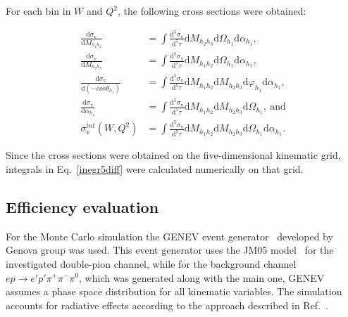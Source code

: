 \documentclass[prc,twocolumn,superscriptaddress,showpacs,amssymb,amsmath,amsfonts,aps,nofootinbib]{revtex4-1}
\begin{document}
For each bin in $W$ and $Q^2$, the following cross sections were obtained:

\begin{equation}
\begin{aligned}
\frac{\textrm{d}\sigma_{\text{v}}}{\textrm{d}M_{h_{1}h_{2}}} & =
\int\frac{\textrm{d}^{5}\sigma_{\text{v}}}{\textrm{d}^{5}\tau}\textrm{d}M_{h_{2}h_{3}}\textrm{d}\Omega_{h_{1}}\textrm{d}\alpha_{h_{1}}\text{,}  \\
\frac{\textrm{d}\sigma_{\text{v}}}{\textrm{d}M_{h_{2}h_{3}}} & =
\int\frac{\textrm{d}^{5}\sigma_{\text{v}}}{\textrm{d}^{5}\tau}\textrm{d}M_{h_{1}h_{2}}\textrm{d}\Omega_{h_{1}}\textrm{d}\alpha_{h_{1}}\text{,} \\
\frac{\textrm{d}\sigma_{\text{v}}}{\textrm{d}(-cos\theta_{h_{1}})} & =
\int\frac{\textrm{d}^{5}\sigma_{\text{v}}}{\textrm{d}^{5}\tau}\textrm{d}M_{h_{1}h_{2}}\textrm{d}M_{h_{2}h_{3}}\textrm{d}\varphi_{h_{1}}\textrm{d}\alpha_{h_{1}}\text{,}  \\
\frac{\textrm{d}\sigma_{\text{v}}}{\textrm{d}\alpha_{h_{1}}} & =
\int\frac{\textrm{d}^{5}\sigma_{\text{v}}}{\textrm{d}^{5}\tau} \textrm{d}M_{h_{1}h_{2}}\textrm{d}M_{h_{2}h_{3}}\textrm{d}\Omega_{h_{1}},~\text{and} \\
\sigma^{int}_{\text{v}}(W,Q^{2}) & =
\int\frac{\textrm{d}^{5}\sigma_{\text{v}}}{\textrm{d}^{5}\tau}\textrm{d}M_{h_{1}h_{2}}\textrm{d}M_{h_{2}h_{3}}\textrm{d}\Omega_{h_{1}}\textrm{d}\alpha_{h_{1}}.
\end{aligned}
\label{inegr5diff}
\end{equation}

Since the cross sections were obtained on the
five-dimensional kinematic grid,
integrals in Eq.~\eqref{inegr5diff} were calculated numerically 
on that grid. 









\subsection{Efficiency evaluation}
\label{eff_err}

For the Monte Carlo simulation the GENEV event generator~\cite{Genev} developed by 
Genova group was used. This event generator uses the JM05 model~\cite{Mokeev:2005re} for the investigated double-pion channel,
while for the background channel $e p \rightarrow e'p'\pi^{+}\pi^{-}\pi^{0}$, which was generated along with the main one, GENEV assumes a phase space distribution for all kinematic variables. The simulation accounts for radiative effects according to the approach described in Ref.~\cite{Mo:1968cg}.
\end{document}
